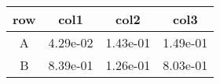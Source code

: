 \begin{tabular}{cccc}
\toprule
row&col1&col2&col3\tabularnewline
\midrule
A&4.29e-02&1.43e-01&1.49e-01\tabularnewline
B&8.39e-01&1.26e-01&8.03e-01\tabularnewline
\bottomrule
\end{tabular}

